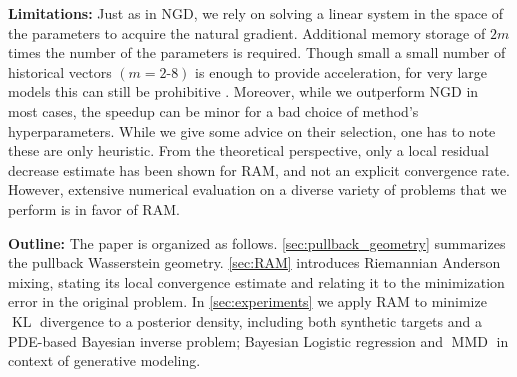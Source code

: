 \documentclass{article} %
\numberwithin{equation}{subsection}
\numberwithin{theorem}{section}
\begin{document}
    \textbf{Limitations:} Just as in NGD, we rely on solving a linear system in the space of the parameters to acquire the natural gradient. 
    Additional memory storage of $2m$ times the number of the parameters is required. 
    Though small  a small number of historical vectors $(m = 2\text{-}8)$ is enough to provide acceleration, for very large models this can still be prohibitive . 
    Moreover, while we outperform NGD in most cases, the speedup can be minor for a bad choice of method's hyperparameters. 
    While we give some advice on their selection, one has to note these are only heuristic.
    From the theoretical perspective, only a local residual decrease estimate has been shown for RAM, and not an explicit convergence rate. 
    However, extensive numerical evaluation on a diverse variety of problems that we perform is in favor of RAM.

    \textbf{Outline:} The paper is organized as follows. 
    \autoref{sec:pullback_geometry} summarizes the pullback Wasserstein geometry. 
    \autoref{sec:RAM} introduces Riemannian Anderson mixing, stating its local convergence estimate and relating it to the minimization error in the original problem.
    In \autoref{sec:experiments} we apply RAM to minimize $\operatorname{KL}$ divergence to a posterior density, including both synthetic targets and a PDE-based Bayesian inverse problem; Bayesian Logistic regression
    and  $\operatorname{MMD}$ in context of generative modeling.%
    
\end{document}

